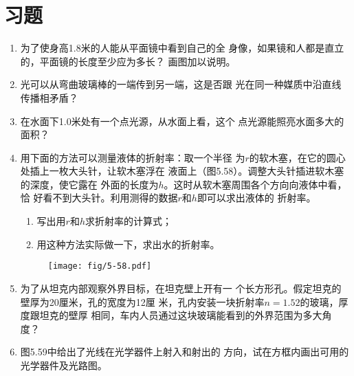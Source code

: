 \section*{习题}
\begin{enumerate}
    \item 为了使身高1.8米的人能从平面镜中看到自己的全
身像，如果镜和人都是直立的，平面镜的长度至少应为多长？
画图加以说明。
\item 光可以从弯曲玻璃棒的一端传到另一端，这是否跟
光在同一种媒质中沿直线传播相矛盾？
\item 在水面下1.0米处有一个点光源，从水面上看，这个
点光源能照亮水面多大的面积？
\item 用下面的方法可以测量液体的折射率：取一个半径
为$r$的软木塞，在它的圆心处插上一枚大头针，让软木塞浮在
液面上（图5.58）。调整大头针插进软木塞的深度，使它露在
外面的长度为$h$。这时从软木塞周围各个方向向液体中看，恰
好看不到大头针。利用测得的数据$r$和$h$即可以求出液体的
折射率。
\begin{enumerate}
    \item 写出用$r$和$h$求折射率的计算式；
    \item 用这种方法实际做一下，求出水的折射率。
\end{enumerate}
\begin{figure}[htp]\centering
    \texttt{[image: fig/5-58.pdf]}
    \caption{}
    \end{figure}
\item 为了从坦克内部观察外界目标，在坦克壁上开有一
个长方形孔。假定坦克的壁厚为20厘米，孔的宽度为12厘
米，孔内安装一块折射率$n=1.52$的玻璃，厚度跟坦克的壁厚
相同，车内人员通过这块玻璃能看到的外界范围为多大角度？
\item 图5.59中给出了光线在光学器件上射入和射出的
方向，试在方框内画出可用的光学器件及光路图。
\begin{figure}[htp]
	\centering
{}
\end{figure}
\end{enumerate}
